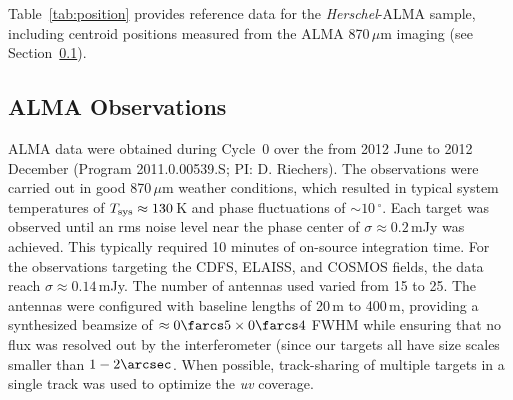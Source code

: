 \documentclass[iop]{emulateapj}
\begin{document}

Table~\ref{tab:position} provides reference data for the {\it Herschel}-ALMA sample, including
centroid positions measured from the ALMA 870$\, \mu$m imaging (see
Section~\ref{sec:almaobs}).

\subsection{ALMA Observations}\label{sec:almaobs}

ALMA data were obtained during Cycle~0 over the from 2012 June to 2012 December
(Program 2011.0.00539.S; PI: D. Riechers).  The observations were carried out
in good 870$\,\mu$m weather conditions, which resulted in typical system
temperatures of $T_{\rm sys} \approx 130\,$K and phase fluctuations of $\sim
10\,^\circ$.  Each target was observed until an rms noise level near the phase
center of $\sigma \approx 0.2\,$mJy was achieved.  This typically required 10
minutes of on-source integration time.  For the observations targeting the
CDFS, ELAISS, and COSMOS fields, the data reach $\sigma \approx 0.14\,$mJy.
The number of antennas used varied from 15 to 25.  The antennas were configured
with baseline lengths of 20$\,$m to 400$\,$m, providing a synthesized beamsize
of $\approx 0\farcs5 \times 0\farcs4$ FWHM while ensuring that no flux was
resolved out by the interferometer (since our targets all have size scales
smaller than $1-2 \arcsec$.  When possible, track-sharing of multiple targets
in a single track was used to optimize the {\it uv} coverage.
\end{document}
